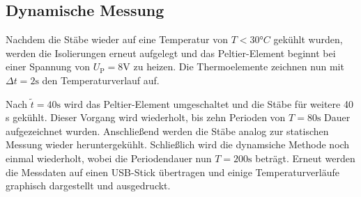 \subsection{Dynamische Messung}
Nachdem die Stäbe wieder auf eine Temperatur von $T<30°C$ gekühlt wurden, werden die Isolierungen erneut aufgelegt und das Peltier-Element beginnt bei einer Spannung von $U_\mathup{P}=8 \si{\volt}$ zu heizen. Die Thermoelemente zeichnen nun mit $\Delta{t}=2\si{\second}$ den Temperaturverlauf auf.

Nach $\tilde{t}=40\si\second$ wird das Peltier-Element umgeschaltet und die Stäbe für weitere 40 s gekühlt. Dieser Vorgang wird wiederholt, bis zehn Perioden von $T=80\si\second$ Dauer aufgezeichnet wurden. Anschließend werden die Stäbe analog zur statischen Messung wieder heruntergekühlt. Schließlich wird die dynamsiche Methode noch einmal wiederholt, wobei die Periodendauer nun $T=200\si\second$ beträgt. Erneut werden die Messdaten auf einen USB-Stick übertragen und einige Temperaturverläufe graphisch dargestellt und ausgedruckt.
